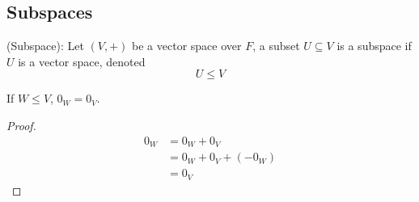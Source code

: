 \subsection{Subspaces}

\begin{definition}
(Subspace): Let $(V, +)$ be a vector space over $F$, a subset $U \subseteq V$ is a subspace if $U$ is a vector space, denoted
\[
  U \leq V
\]
\end{definition}

\begin{remark}
If $W \leq V$, $0_W = 0_V$.
\end{remark}


\begin{proof}
\begin{align*}
    0_W &= 0_W + 0_V \\
    &= 0_W + 0_V + (-0_W) \\
    &= 0_V
\end{align*}
\end{proof}

\newpage